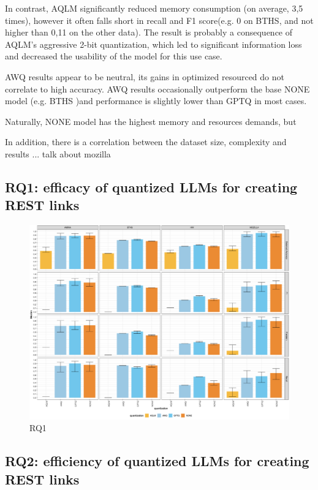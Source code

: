 \documentclass[conference]{IEEEtran}
\begin{document}
In contrast, AQLM significantly reduced memory consumption (on average, 3,5 times), however it often falls short in recall and F1 score(e.g. 0 on BTHS, and not higher than 0,11 on the other data). The result is probably a consequence of AQLM's aggressive 2-bit quantization, which led to significant information loss and decreased the usability of the model for this use case.

AWQ results appear to be neutral, its gains in optimized resourced do not correlate to high accuracy. AWQ results occasionally outperform the base NONE model (e.g. BTHS )and performance is slightly lower than GPTQ in most cases.


Naturally, NONE model has the highest memory and resources demands, but

 In addition, there is a correlation between the dataset size, complexity and results ...
talk about mozilla 


 

\subsection{\textbf{RQ1:} efficacy of quantized LLMs for creating REST links}

\begin{figure}[H]
    \centering
    \includegraphics[width=0.99\columnwidth]{images/RQ1_quant_comparison.png}
    \caption{RQ1}
    \label{fig:rq1}
\end{figure}

\subsection{\textbf{RQ2:} efficiency of quantized LLMs for creating REST links}
\end{document}

